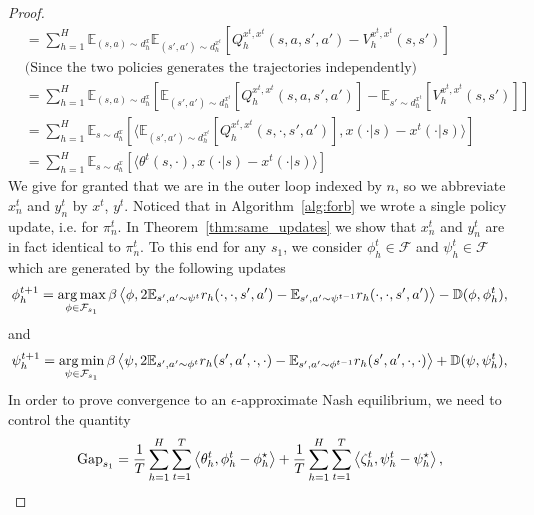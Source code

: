 \begin{proof}
\begin{align*}
&= \sum^H_{h=1}\mathbb{E}_{(s, a) \sim d^{x}_h} \mathbb{E}_{(s', a') \sim d^{x^t}_h}\left[ Q_h^{x^t,x^t}(s,a,s',a') - V_h^{x^t,x^t}(s,s')\right] \\&\text{(Since the two policies generates the trajectories independently)}
\\&= \sum^H_{h=1}\mathbb{E}_{(s, a) \sim d^{x}_h} \left[ \mathbb{E}_{(s', a') \sim d^{x^t}_h}[Q_h^{x^t,x^t}(s,a,s',a')] - \mathbb{E}_{s' \sim d^{x^t}_h}[V_h^{x^t,x^t}(s,s')]\right] \\&=
\sum^H_{h=1}\mathbb{E}_{s \sim d^{x}_h} \left[ \langle \mathbb{E}_{(s', a') \sim d^{x^t}_h}[Q_h^{x^t,x^t}(s,\cdot,s',a')], x(\cdot|s) - x^t(\cdot|s) \rangle \right] \\&=
\sum^H_{h=1} \mathbb{E}_{s \sim d^{x}_h} \left[ \langle \theta^t(s,\cdot), x(\cdot|s) - x^t(\cdot|s) \rangle \right]
\end{align*}
\fi
We give for granted that we are in the outer loop indexed by $n$, so we abbreviate $x^t_n$ and $y^t_n$ by $x^t$, $y^t$. Noticed that in Algorithm~\ref{alg:forb} we wrote a single policy update, i.e. for $\pi^t_n$. In Theorem~\ref{thm:same_updates} we show that  $x^t_n$ and $y^t_n$ are in fact identical to $\pi^t_n$.
\fi
To this end for any $s_1$, we consider $\phi^t_h \in \mathcal{F}$ and $\psi^t_h \in \mathcal{F}$ which are generated by the following updates
\begin{align*}
            \phi_h^{t+1} = \operatorname*{arg\,max}_{\phi \in \mathcal{F}_{s_1}} 
            \beta \left\langle{\phi},{
            2 \mathbb{E}_{s',a' \sim \psi^t}r_h(\cdot,\cdot,s',a') - \mathbb{E}_{s',a' \sim \psi^{t-1}}r_h(\cdot,\cdot,s',a')}\right\rangle - \mathbb{D}(\phi, \phi_h^t),
        \end{align*}
        and
        \begin{align*}
            \psi_h^{t+1} = \operatorname*{arg\,min}_{\psi \in \mathcal{F}_{s_1}} 
            \beta \left\langle{\psi},{
            2 \mathbb{E}_{s',a' \sim \phi^t}r_h(s',a',\cdot,\cdot) - \mathbb{E}_{s',a' \sim \phi^{t-1}}r_h(s',a',\cdot,\cdot)}\right\rangle + \mathbb{D}(\psi, \psi_h^t),
        \end{align*}
        In order to prove convergence to an $\epsilon$-approximate Nash equilibrium, we need to control the quantity
\begin{align*}
\mathrm{Gap}_{s_1} = \frac{1}{T}\sum^H_{h=1}\sum^T_{t=1}\innerprod{\theta_h^t}{\phi_h^t - \phi_h^\star} + \frac{1}{T}\sum^H_{h=1}\sum^T_{t=1}\innerprod{\zeta_h^t}{\psi_h^t - \psi_h^\star},

\end{align*}
\end{proof}
